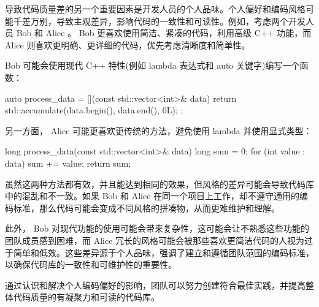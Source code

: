 导致代码质量差的另一个重要因素是开发人员的个人品味。个人偏好和编码风格可能千差万别，导致主观差异，影响代码的一致性和可读性。例如，考虑两个开发人员 Bob 和 Alice 。 Bob 更喜欢使用简洁、紧凑的代码，利用高级 C++ 功能，而 Alice 则喜欢更明确、更详细的代码，优先考虑清晰度和简单性。

Bob 可能会使用现代 C++ 特性(例如 lambda 表达式和 auto 关键字)编写一个函数：

\begin{cpp}
auto process_data = [](const std::vector<int>& data) {
    return std::accumulate(data.begin(), data.end(), 0L);
};
\end{cpp}

另一方面， Alice 可能更喜欢更传统的方法，避免使用 lambda 并使用显式类型：

\begin{cpp}
long process_data(const std::vector<int>& data) {
    long sum = 0;
    for (int value : data) {
        sum += value;
    }
    return sum;
}
\end{cpp}

虽然这两种方法都有效，并且能达到相同的效果，但风格的差异可能会导致代码库中的混乱和不一致。如果 Bob 和 Alice 在同一个项目上工作，却不遵守通用的编码标准，那么代码可能会变成不同风格的拼凑物，从而更难维护和理解。

此外， Bob 对现代功能的使用可能会带来复杂性，这可能会让不熟悉这些功能的团队成员感到困难，而 Alice 冗长的风格可能会被那些喜欢更简洁代码的人视为过于简单和低效。这些差异源于个人品味，强调了建立和遵循团队范围的编码标准，以确保代码库的一致性和可维护性的重要性。

通过认识和解决个人编码偏好的影响，团队可以努力创建符合最佳实践，并提高整体代码质量的有凝聚力和可读的代码库。
